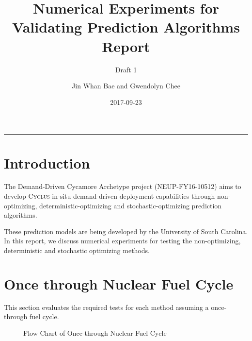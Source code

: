 \documentclass[12pt,letterpaper]{article}
\title{Numerical Experiments for Validating Prediction Algorithms Report}
\subtitle{Draft 1}
\author{Jin Whan Bae and Gwendolyn Chee}
\date{2017-09-23}
\newcommand{\Cyclus}{\textsc{Cyclus}\xspace}%
\begin{document}
	
	\maketitle
	\hrule
	\onehalfspacing
	\thispagestyle{empty}

\section*{Introduction}
The Demand-Driven Cycamore Archetype project (NEUP-FY16-10512) aims to develop \Cyclus in-situ demand-driven deployment capabilities through non-optimizing, deterministic-optimizing and stochastic-optimizing prediction algorithms.

These prediction models are being developed by the University of South Carolina. In this report, we discuss numerical experiments for testing the non-optimizing, deterministic and stochastic optimizing methods. 

\section{Once through Nuclear Fuel Cycle}
This section evaluates the required tests for
each method assuming a once-through fuel cycle.

\begin{figure}[H]
\caption{Flow Chart of Once through Nuclear Fuel Cycle}
\end{figure}
\end{document}
